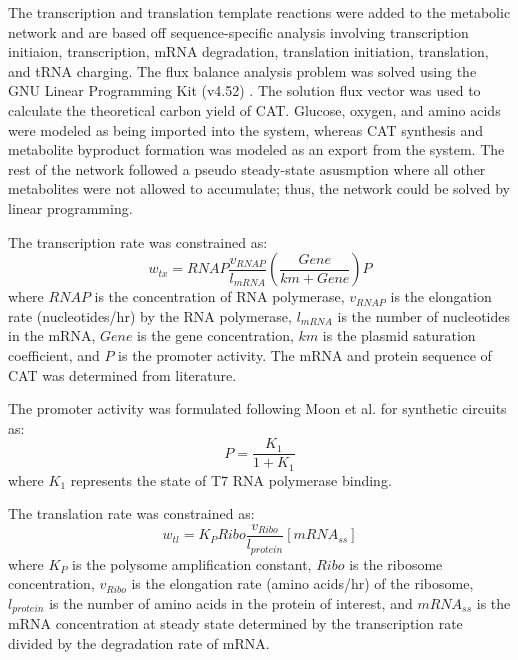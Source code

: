 \documentclass[12pt]{article}
\begin{document}
The transcription and translation template reactions were added to the metabolic network and are based off sequence-specific analysis \cite{2002_allen_palsson} involving transcription initiaion, transcription, mRNA degradation, translation initiation, translation, and tRNA charging. 
The flux balance analysis problem was solved using the GNU Linear Programming Kit (v4.52) \cite{GLPK}.
The solution flux vector was used to calculate the theoretical carbon yield of CAT.
Glucose, oxygen, and amino acids were modeled as being imported into the system, whereas CAT synthesis and metabolite byproduct formation was modeled as an export from the system.
The rest of the network followed a pseudo steady-state asusmption where all other metabolites were not allowed to accumulate; thus, the network could be solved by linear programming.

The transcription rate was constrained as:
\begin{equation}\nonumber
	w_{tx} = RNAP\frac{v_{RNAP}}{l_{mRNA}}\left(\frac{Gene}{km+Gene}\right)P
\end{equation}
where $RNAP$ is the concentration of RNA polymerase, $v_{RNAP}$ is the elongation rate (nucleotides/hr) by the RNA polymerase, $l_{mRNA}$ is the number of nucleotides in the mRNA, $Gene$ is the gene concentration, $km$ is the plasmid saturation coefficient, and $P$ is the promoter activity.
The mRNA and protein sequence of CAT was determined from literature.

The promoter activity was formulated following Moon et al. for synthetic circuits as:
\begin{equation}\nonumber
	P = \frac{K_{1}}{1 + K_{1}}
\end{equation}
where $K_{1}$ represents the state of T7 RNA polymerase binding. 

The translation rate was constrained as:
 \begin{equation}\nonumber
	w_{tl} = K_{P}Ribo\frac{v_{Ribo}}{l_{protein}}[mRNA_{ss}]
\end{equation}
where $K_{P}$ is the polysome amplification constant, $Ribo$ is the ribosome concentration,  $v_{Ribo}$ is the elongation rate (amino acids/hr) of the ribosome, $l_{protein}$ is the number of amino acids in the protein of interest, and $mRNA_{ss}$ is the mRNA concentration at steady state determined by the transcription rate divided by the degradation rate of mRNA.  
\end{document}
